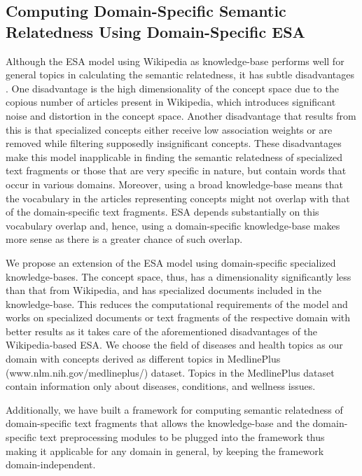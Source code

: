 \documentclass[conference]{IEEEtran}
\begin{document}
\subsection {Computing Domain-Specific Semantic Relatedness Using Domain-Specific ESA}

Although the ESA model using Wikipedia as knowledge-base performs well for general topics in calculating the semantic relatedness, it has subtle disadvantages \cite{insights}. One disadvantage is the high dimensionality of the concept space due to the copious number of articles present in Wikipedia, which introduces significant noise and distortion in the concept space. Another disadvantage that results from this is that specialized concepts either receive low association weights or are removed while filtering supposedly insignificant concepts. These disadvantages make this model inapplicable in finding the semantic relatedness of specialized text fragments or those that are very specific in nature, but contain words that occur in various domains. Moreover, using a broad knowledge-base means that the vocabulary in the articles representing concepts might not overlap with that of the domain-specific text fragments. ESA depends substantially on this vocabulary overlap and, hence, using a domain-specific knowledge-base makes more sense as there is a greater chance of such overlap.

We propose an extension of the ESA model using domain-specific specialized knowledge-bases. The concept space, thus, has a dimensionality significantly less than that from Wikipedia, and has specialized documents included in the knowledge-base. This reduces the computational requirements of the model and works on specialized documents or text fragments of the respective domain with better results as it takes care of the aforementioned disadvantages of the Wikipedia-based ESA.  We choose the field of diseases and health topics as our domain with concepts derived as different topics in MedlinePlus (www.nlm.nih.gov/medlineplus/‎) dataset. Topics in the MedlinePlus dataset contain information only about diseases, conditions, and wellness issues.

Additionally, we have built a framework for computing semantic relatedness of domain-specific text fragments that allows the knowledge-base and the domain-specific text preprocessing modules to be plugged into the framework thus making it applicable for any domain in general, by keeping the framework domain-independent.

\end{document}
